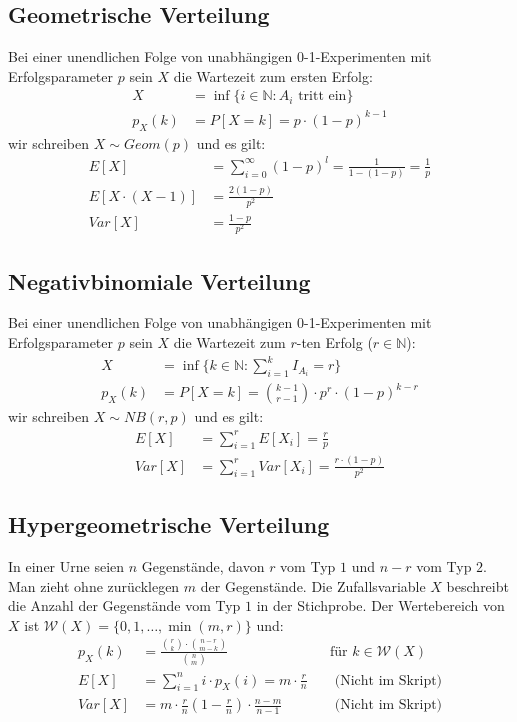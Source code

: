 \documentclass[8pt]{extarticle}
\newcommand{\N}{\mathbb{N}}
\newcommand{\W}{\mathcal{W}}
\newcommand{\Sn}{\sum_{i = 1}^n}
\begin{document}
\begin{multicols*}{3}
  \subsection*{Geometrische Verteilung}
  Bei einer unendlichen Folge von unabhängigen 0-1-Experimenten mit
  Erfolgsparameter $p$ sein $X$ die Wartezeit zum ersten Erfolg:
  \begin{align*}
    X      & = \inf \{ i \in \N : A_i \text{ tritt ein} \} \\
    p_X (k) & = P[X = k] = p \cdot  (1-p)^{k-1}
  \end{align*}
  wir schreiben $X \sim Geom (p)$ und es gilt:
  \begin{align*}
    E[X]             & = \sum_{i = 0}^\infty  (1-p)^l
    = \frac{1}{1- (1-p)} = \frac{1}{p}                \\
    E[X \cdot  (X-1)] & = \frac{2 (1-p)}{p^2}          \\
    Var[X]           & = \frac{1-p}{p^2}
  \end{align*}
  \subsection*{Negativbinomiale Verteilung}
  Bei einer unendlichen Folge von unabhängigen 0-1-Experimenten mit
  Erfolgsparameter $p$ sein $X$ die Wartezeit zum $r$-ten Erfolg  ($r \in \N$):
  \begin{align*}
    X      & = \inf \{ k \in \N : \sum_{i = 1}^k I_{A_i} = r \}        \\
    p_X (k) & = P[X = k] = \binom{k-1}{r-1} \cdot p^r \cdot  (1-p)^{k-r}
  \end{align*}
  wir schreiben $X \sim NB (r, p)$ und es gilt:
  \begin{align*}
    E[X]   & = \sum_{i = 1}^r E[X_i] = \frac{r}{p}                 \\
    Var[X] & = \sum_{i = 1}^r Var[X_i] = \frac{r \cdot  (1-p)}{p^2}
  \end{align*}

  \subsection*{Hypergeometrische Verteilung}
  In einer Urne seien $n$ Gegenstände, davon $r$ vom Typ $1$ und $n-r$ vom Typ
  $2$. Man zieht ohne zurücklegen $m$ der Gegenstände. Die Zufallsvariable $X$
  beschreibt die Anzahl der Gegenstände vom Typ $1$ in der Stichprobe. Der
  Wertebereich von $X$ ist $\W (X) = \{0, 1, \dots, \min (m, r)\}$ und:
  \begin{align*}
    p_X (k) & = \frac{\binom{r}{k} \cdot \binom{n-r}{m-k}}{\binom{n}{m}}
           &                                                                                & \text{für } k \in \W (X)                            \\
    E[X]   & = \Sn i \cdot p_X (i) = m \cdot \frac{r}{n}                                     &                         & \text{ (Nicht im Skript)} \\
    Var[X] & = m \cdot \frac{r}{n} \left  (1 - \frac{r}{n} \right) \cdot \frac{n - m}{n - 1} &                         & \text{ (Nicht im Skript)}
  \end{align*}

\end{multicols*}
\end{document}
